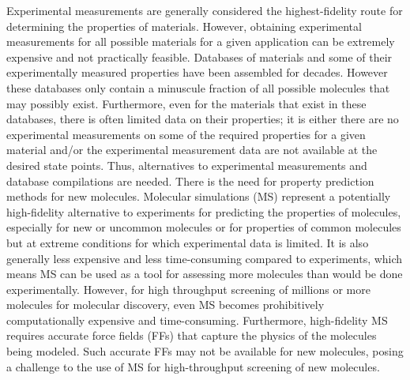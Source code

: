 \documentclass[journal=jacsat,manuscript=article]{achemso}
\begin{document}
Experimental measurements are generally considered the highest-fidelity route for determining the properties of materials. 
However, obtaining experimental measurements for all possible materials for a given application can be extremely expensive and not practically feasible. 
Databases \cite{Kim2023, yaws-critical-property, bookRumble2023, Dortmund2024} of materials and some of their experimentally measured properties have been assembled for decades. However these databases only contain a minuscule fraction of all possible molecules that may possibly exist. Furthermore, even for the materials that exist in these databases, there is often limited data on their properties; it is either there are no experimental measurements on some of the required properties for a given material and/or the experimental measurement data are not available at the desired state points. Thus, alternatives to experimental measurements and database compilations are needed. There is the need for property prediction methods for new molecules.
Molecular simulations (MS) represent a potentially high-fidelity alternative to experiments for predicting the properties of molecules, especially for new or uncommon molecules or for properties of common molecules but at extreme conditions for which experimental data is limited. It is also generally less expensive and less time-consuming compared to experiments, which means MS can be used as a tool for assessing more molecules than would be done experimentally. However, for high throughput screening of millions or more molecules for molecular discovery, even MS becomes prohibitively computationally expensive and time-consuming. Furthermore, high-fidelity MS requires accurate force fields (FFs) that capture the physics of the molecules being modeled. Such accurate FFs may not be available for new molecules, posing a challenge to the use of MS for high-throughput screening of new molecules. 
\end{document}
